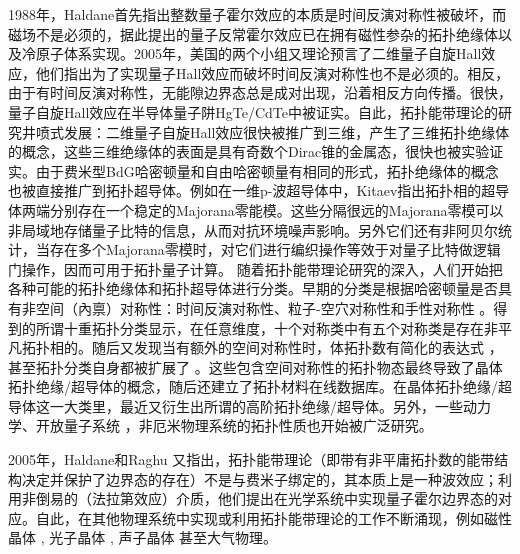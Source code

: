 1988年，Haldane首先指出整数量子霍尔效应的本质是时间反演对称性被破坏，而磁场不是必须的\cite{Haldane1988}，据此提出的量子反常霍尔效应已在拥有磁性参杂的拓扑绝缘体\cite{Chang2013}以及冷原子体系\cite{Jotzu2014}实现。2005年，美国的两个小组又理论预言了二维量子自旋Hall效应\cite{Kane2005,Bernevig2006a}，他们指出为了实现量子Hall效应而破坏时间反演对称性也不是必须的。相反，由于有时间反演对称性，无能隙边界态总是成对出现，沿着相反方向传播。很快，量子自旋Hall效应在半导体量子阱HgTe/CdTe中被证实\cite{Bernevig2006}。自此，拓扑能带理论的研究井喷式发展：二维量子自旋Hall效应很快被推广到三维，产生了三维拓扑绝缘体的概念\cite{Moore2007,Fu2007a,Roy2009}，这些三维绝缘体的表面是具有奇数个Dirac锥的金属态，很快也被实验证实\cite{Hsieh2008}。由于费米型BdG哈密顿量和自由哈密顿量有相同的形式，拓扑绝缘体的概念也被直接推广到拓扑超导体。例如在一维p-波超导体中，Kitaev指出拓扑相的超导体两端分别存在一个稳定的Majorana零能模\cite{Kitaev2001}。这些分隔很远的Majorana零模可以非局域地存储量子比特的信息，从而对抗环境噪声影响。另外它们还有非阿贝尔统计\cite{Ivanov2001}，当存在多个Majorana零模时，对它们进行编织操作等效于对量子比特做逻辑门操作，因而可用于拓扑量子计算\cite{Pachos2014}。
随着拓扑能带理论研究的深入，人们开始把各种可能的拓扑绝缘体和拓扑超导体进行分类。早期的分类是根据哈密顿量是否具有非空间（內禀）对称性：时间反演对称性、粒子-空穴对称性和手性对称性 \cite{Altland1997,Zirnbauer2018}。得到的所谓十重拓扑分类显示，在任意维度，十个对称类中有五个对称类是存在非平凡拓扑相的。随后又发现当有额外的空间对称性时，体拓扑数有简化的表达式 \cite{Fu2007}，甚至拓扑分类自身都被扩展了 \cite{Fu2011}。这些包含空间对称性的拓扑物态最终导致了晶体拓扑绝缘/超导体的概念\cite{Ando2015}，随后还建立了拓扑材料在线数据库\cite{vergniory2019complete,zhang2019catalogue,tang2019comprehensive}。在晶体拓扑绝缘/超导体这一大类里，最近又衍生出所谓的高阶拓扑绝缘/超导体\cite{Benalcazar2017,Langbehn2017,Benalcazar2017a,Schindler2018}。另外，一些动力学\cite{Chang2018,Yang2018,Gong2018,Qiu2018}、开放量子系统 \cite{Shen2018,Kawabata2018,Kawabata2019,Song2019}，非厄米物理系统\cite{Yao2018a,Yao2018,Xiao2020}的拓扑性质也开始被广泛研究。

2005年，Haldane和Raghu \cite{Raghu2008,Haldane2008}又指出，拓扑能带理论（即带有非平庸拓扑数的能带结构决定并保护了边界态的存在）不是与费米子绑定的，其本质上是一种波效应；利用非倒易的（法拉第效应）介质，他们提出在光学系统中实现量子霍尔边界态的对应。自此，在其他物理系统中实现或利用拓扑能带理论的工作不断涌现，例如磁性晶体 \cite{Shindou2013,Chisnell2015,Kondo2019}, 光子晶体 \cite{Wang2008,Rechtsman2013,Peano2016}, 声子晶体 \cite{Fleury2014,SafaviNaeini2014,Peano2015} 甚至大气物理\cite{Delplace2017}。

